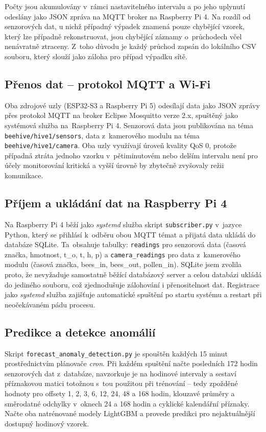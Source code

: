Počty jsou akumulovány v~rámci nastavitelného intervalu a po jeho uplynutí odeslány jako JSON zpráva na MQTT broker na Raspberry Pi 4. Na rozdíl od senzorových dat, u nichž případný výpadek znamená pouze chybějící vzorek, který lze případně rekonstruovat, jsou chybějící záznamy o~průchodech včel nenávratně ztraceny. Z~toho důvodu je každý průchod zapsán do lokálního CSV souboru, který slouží jako záloha pro případ výpadku sítě.

\subsection*{Přenos dat -- protokol MQTT a Wi-Fi}
Oba zdrojové uzly (ESP32-S3 a Raspberry Pi 5) odesílají data jako JSON zprávy přes protokol MQTT na broker Eclipse Mosquitto verze 2.x, spuštěný jako systémová služba na~Raspberry Pi 4. Senzorová data jsou publikována na téma \texttt{beehive/hive1/sensors}, data z~kamerového modulu na téma \texttt{beehive/hive1/camera}. Oba uzly využívají úroveň kvality QoS 0, protože případná ztráta jednoho vzorku v~pětiminutovém nebo delším intervalu není pro účely monitorování kritická a vyšší úrovně by zbytečně zvyšovaly režii komunikace.

\subsection*{Příjem a ukládání dat na Raspberry Pi 4}
Na Raspberry Pi 4 běží jako \textit{systemd} služba skript \texttt{subscriber.py} v~jazyce Python, který se přihlásí k~odběru obou MQTT témat a přijatá data ukládá do databáze SQLite. Ta~obsahuje tabulky: \texttt{readings} pro senzorová data (časová značka, hmotnost, t\_o, t, h, p) a \texttt{camera\_readings} pro data z~kamerového modulu (časová značka, bees\_in, bees\_out, pollen\_in). SQLite jsem zvolila proto, že nevyžaduje samostatně běžící databázový server a celou databázi ukládá do jediného souboru, což zjednodušuje zálohování i přenositelnost dat. Registrace jako \textit{systemd} služba zajišťuje automatické spuštění po startu systému a restart při neočekávaném pádu procesu.

\subsection*{Predikce a detekce anomálií}
Skript \texttt{forecast\_anomaly\_detection.py} je spouštěn každých 15 minut prostřednictvím plánovače \textit{cron}. Při každém spuštění načte posledních 172 hodin senzorových dat z~databáze, navzorkuje je na hodinové intervaly a sestaví příznakovou matici totožnou s~tou použitou při trénování -- tedy zpožděné hodnoty pro offsety 1, 2, 3, 6, 12, 24, 48 a 168 hodin, klouzavé průměry a směrodatné odchylky v~oknech 24 a 168 hodin a cyklické kalendářní příznaky. Načte oba natrénované modely LightGBM a provede predikci pro nejaktuálnější dostupný hodinový vzorek.

